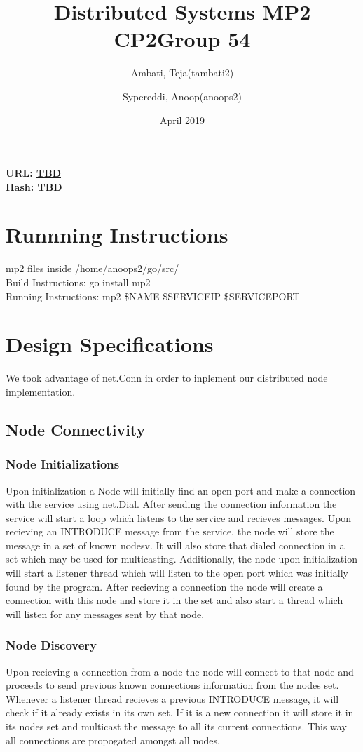 \documentclass{article}
\title{Distributed Systems MP2 CP2\textbf{Group 54}}
\author{
	Ambati, Teja(tambati2)\\
	\and
	Sypereddi, Anoop(anoops2)\\
}
\date{April 2019}
\begin{document}
	\maketitle
		\textbf{URL: \url{TBD}}\\
		\textbf{Hash: TBD}
  \section{Runnning Instructions}
        mp2 files inside /home/anoops2/go/src/\\
        Build Instructions: go install mp2\\
		    Running Instructions: mp2 \$NAME \$SERVICEIP \$SERVICEPORT\\
  \section{Design Specifications}
		    We took advantage of net.Conn in order to inplement our distributed node implementation.
		\subsection{Node Connectivity}
	      \subsubsection{Node Initializations}
              Upon initialization a Node will initially find an open port and make a connection with the service using net.Dial. After sending the connection information the service will start a loop which listens to the service and recieves messages. Upon recieving an INTRODUCE message from the service, the node will store the message in
a set of known nodesv. It will also store that dialed connection in a set which may be used for multicasting. Additionally, the node upon initialization will start a listener thread which will listen to the open port which was initially found by the program. After recieving a connection the node will create a connection with this node and store it in the set and also start a thread which will listen for any messages sent by that node.
        \subsubsection{Node Discovery}
              Upon recieving a connection from a node the node will connect to that node and proceeds to send previous known connections information from the nodes set. Whenever a listener thread recieves a previous INTRODUCE message, it will check if it already exists in its own set. If it is a new connection it will store it in its nodes set and multicast the message to all its current connections. This way all connections are propogated amongst all nodes.
\end{document}

